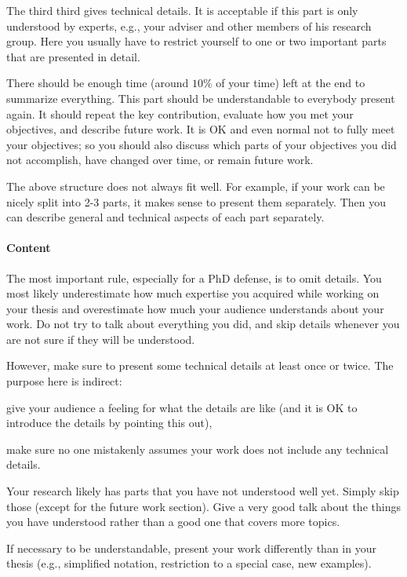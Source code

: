 \documentclass[12pt]{article}
\begin{document}
The third third gives technical details.
It is acceptable if this part is only understood by experts, e.g., your adviser and other members of his research group.
Here you usually have to restrict yourself to one or two important parts that are presented in detail.
\medskip

There should be enough time (around $10\%$ of your time) left at the end to summarize everything.
This part should be understandable to everybody present again.
It should repeat the key contribution, evaluate how you met your objectives, and describe future work.
It is OK and even normal not to fully meet your objectives; so you should also discuss which parts of your objectives you did not accomplish, have changed over time, or remain future work.
\medskip

The above structure does not always fit well.
For example, if your work can be nicely split into 2-3 parts, it makes sense to present them separately.
Then you can describe general and technical aspects of each part separately.

\paragraph{Content}
The most important rule, especially for a PhD defense, is to omit details.
You most likely underestimate how much expertise you acquired while working on your thesis and overestimate how much your audience understands about your work.
Do not try to talk about everything you did, and skip details whenever you are not sure if they will be understood.
\medskip

However, make sure to present some technical details at least once or twice.
The purpose here is indirect:
\begin{compactitem}
 \item give your audience a feeling for what the details are like (and it is OK to introduce the details by pointing this out),
 \item make sure no one mistakenly assumes your work does not include any technical details.
\end{compactitem}
\medskip

Your research likely has parts that you have not understood well yet.
Simply skip those (except for the future work section).
Give a very good talk about the things you have understood rather than a good one that covers more topics.

If necessary to be understandable, present your work differently than in your thesis (e.g., simplified notation, restriction to a special case, new examples).
\end{document}

